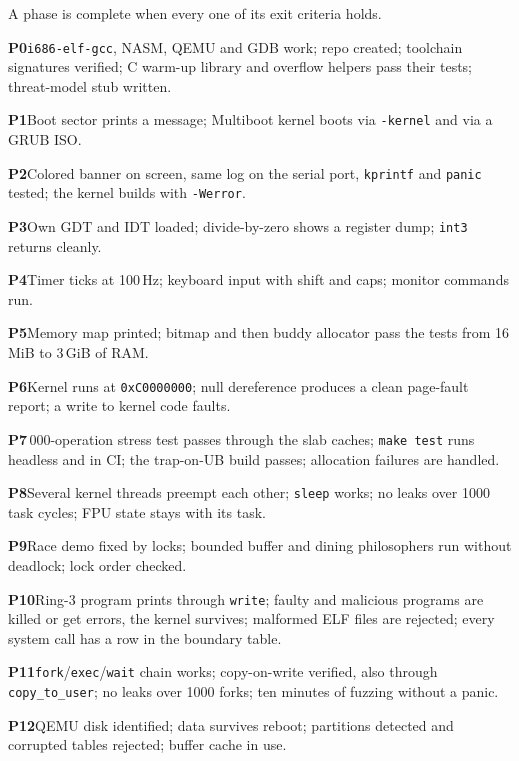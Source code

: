 \documentclass[11pt,a4paper]{article}
\begin{document}
A phase is complete when every one of its exit criteria holds.

\begin{checklist}
  \item \textbf{P0}\enspace \texttt{i686-elf-gcc}, NASM, QEMU and GDB work; repo created; toolchain signatures verified; C warm-up library and overflow helpers pass their tests; threat-model stub written.
  \item \textbf{P1}\enspace Boot sector prints a message; Multiboot kernel boots via \texttt{-kernel} and via a GRUB ISO.
  \item \textbf{P2}\enspace Colored banner on screen, same log on the serial port, \texttt{kprintf} and \texttt{panic} tested; the kernel builds with \texttt{-Werror}.
  \item \textbf{P3}\enspace Own GDT and IDT loaded; divide-by-zero shows a register dump; \texttt{int3} returns cleanly.
  \item \textbf{P4}\enspace Timer ticks at 100\,Hz; keyboard input with shift and caps; monitor commands run.
  \item \textbf{P5}\enspace Memory map printed; bitmap and then buddy allocator pass the tests from 16\,MiB to 3\,GiB of RAM.
  \item \textbf{P6}\enspace Kernel runs at \texttt{0xC0000000}; null dereference produces a clean page-fault report; a write to kernel code faults.
  \item \textbf{P7}\,000-operation stress test passes through the slab caches; \texttt{make test} runs headless and in CI; the trap-on-UB build passes; allocation failures are handled.
  \item \textbf{P8}\enspace Several kernel threads preempt each other; \texttt{sleep} works; no leaks over 1000 task cycles; FPU state stays with its task.
  \item \textbf{P9}\enspace Race demo fixed by locks; bounded buffer and dining philosophers run without deadlock; lock order checked.
  \item \textbf{P10}\enspace Ring-3 program prints through \texttt{write}; faulty and malicious programs are killed or get errors, the kernel survives; malformed ELF files are rejected; every system call has a row in the boundary table.
  \item \textbf{P11}\enspace \texttt{fork}/\texttt{exec}/\texttt{wait} chain works; copy-on-write verified, also through \texttt{copy\_to\_user}; no leaks over 1000 forks; ten minutes of fuzzing without a panic.
  \item \textbf{P12}\enspace QEMU disk identified; data survives reboot; partitions detected and corrupted tables rejected; buffer cache in use.

\end{checklist}
\end{document}
